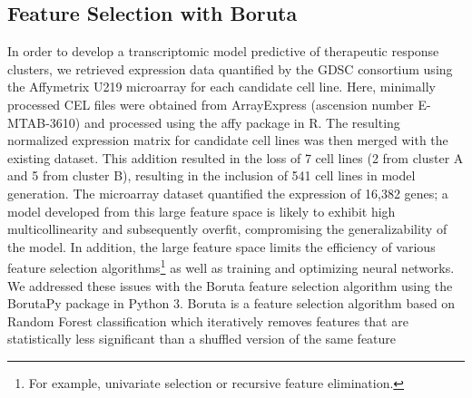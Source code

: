 \documentclass[10pt, letterpaper, twocolumn]{article}
\begin{document}
\subsection{Feature Selection with Boruta}
In order to develop a transcriptomic model predictive of therapeutic response clusters, we retrieved expression data quantified by the GDSC consortium using the Affymetrix U219 microarray for each candidate cell line. Here, minimally processed CEL files were obtained from ArrayExpress (ascension number E-MTAB-3610) and processed using the affy package \cite{affy} in R. The resulting normalized expression matrix for candidate cell lines was then merged with the existing dataset. This addition resulted in the loss of 7 cell lines (2 from cluster A and 5 from cluster B), resulting in the inclusion of 541 cell lines in model generation. The microarray dataset quantified the expression of 16,382 genes; a model developed from this large feature space is likely to exhibit high multicollinearity and subsequently overfit, compromising the generalizability of the model. In addition, the large feature space limits the efficiency of various feature selection algorithms\footnote{For example, univariate selection or recursive feature elimination.} as well as training and optimizing neural networks. We addressed these issues with the Boruta feature selection algorithm using the BorutaPy package \cite{liu} in Python 3. Boruta is a feature selection algorithm based on Random Forest classification which iteratively removes features that are statistically less significant than a shuffled version of the same feature \cite{kursa}
\end{document}
